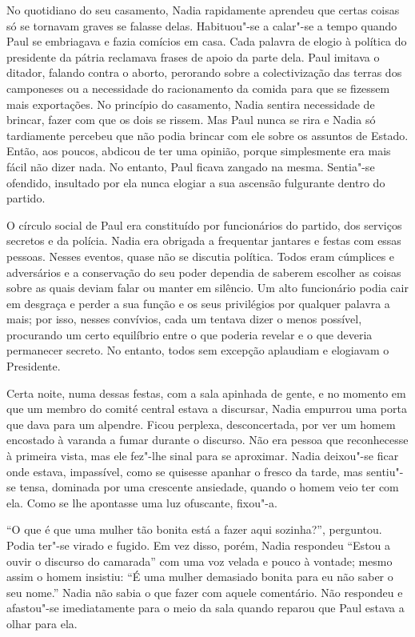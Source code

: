 No quotidiano do seu casamento, Nadia rapidamente aprendeu que certas
coisas só se tornavam graves se falasse delas. Habituou"-se a calar"-se a
tempo quando Paul se embriagava e fazia comícios em casa. Cada palavra
de elogio à política do presidente da pátria reclamava frases de apoio
da parte dela. Paul imitava o ditador, falando contra o aborto,
perorando sobre a colectivização das terras dos camponeses ou a
necessidade do racionamento da comida para que se fizessem mais
exportações. No princípio do casamento, Nadia sentira necessidade de
brincar, fazer com que os dois se rissem. Mas Paul nunca se rira e Nadia
só tardiamente percebeu que não podia brincar com ele sobre os assuntos
de Estado. Então, aos poucos, abdicou de ter uma opinião, porque
simplesmente era mais fácil não dizer nada. No entanto, Paul ficava
zangado na mesma. Sentia"-se ofendido, insultado por ela nunca elogiar a
sua ascensão fulgurante dentro do partido.

O círculo social de Paul era constituído por funcionários do partido, dos serviços secretos e da polícia. Nadia era obrigada
a frequentar jantares e festas com essas pessoas. Nesses eventos,
quase não se discutia política. Todos eram cúmplices e adversários e a
conservação do seu poder dependia de saberem escolher as coisas sobre as
quais deviam falar ou manter em silêncio. Um alto funcionário podia cair
em desgraça e perder a sua função e os seus privilégios por qualquer
palavra a mais; por isso, nesses convívios, cada um tentava dizer o
menos possível, procurando um certo equilíbrio entre o que poderia revelar e o que deveria
permanecer secreto. No entanto, todos sem excepção aplaudiam e elogiavam
o Presidente.

Certa noite, numa dessas festas, com a sala apinhada de gente, e no
momento em que um membro do comité central estava a discursar, Nadia
empurrou uma porta que dava para um alpendre. Ficou perplexa,
desconcertada, por ver um homem encostado à varanda a fumar durante o
discurso. Não era pessoa que reconhecesse à primeira vista, mas ele
fez"-lhe sinal para se aproximar. Nadia deixou"-se ficar onde estava,
impassível, como se quisesse apanhar o fresco da tarde, mas sentiu"-se
tensa, dominada por uma crescente ansiedade, quando o homem veio ter com
ela. Como se lhe apontasse uma luz ofuscante, fixou"-a.

``O que é que uma mulher tão bonita está a fazer aqui sozinha?'',
perguntou. Podia ter"-se virado e fugido. Em vez disso, porém, Nadia
respondeu ``Estou a ouvir o discurso do camarada'' com uma voz velada e
pouco à vontade; mesmo assim o homem insistiu: ``É uma mulher demasiado
bonita para eu não saber o seu nome.'' Nadia não sabia o que fazer com
aquele comentário. Não respondeu e afastou"-se imediatamente para o meio
da sala quando reparou que Paul estava a olhar para ela.

